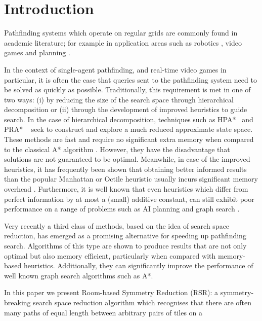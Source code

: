 \section{Introduction}
Pathfinding systems which operate on regular grids are commonly found in
academic literature; for example in application areas such as robotics 
\cite{choset05}, video games \cite{botea04,sturtevant05,bjornsson06} and 
planning \cite{thayer10,DBLP:conf/aips/HernandezMSK09,DBLP:conf/aips/WangB08,DBLP:conf/aips/BulitkoBLSS07}.
\par
In the context of single-agent pathfinding, and real-time video games in particular, 
it is often the case that queries sent to the pathfinding system  need to be solved as quickly as possible.
Traditionally, this requirement is met in one of two ways: (i) by reducing the size of the search space through hierarchical 
decomposition or (ii) through the development of improved heuristics to guide search.
In the case of hierarchical decomposition, techniques such as
HPA*~\cite{botea04} and PRA* ~\cite{sturtevant05} seek to construct and explore
a much reduced approximate state space.
These methods are fast and require no significant extra memory when compared to the classical
A* algorithm \cite{hart68}.
However, they have the disadvantage that solutions are not guaranteed to be optimal.
Meanwhile, in case of the improved heuristics, it has frequently been shown
that obtaining better informed results than the popular
Manhattan or Octile heuristic usually incurs significant memory overhead 
\cite{sturtevant09,goldberg05,Cazenave:06,bjornsson06}.
Furthermore, it is well known that even heuristics which differ from perfect information 
by at most a (small) additive constant, can still exhibit poor performance on a range of 
problems such as AI planning and graph search \cite{helmert08,pohl77}.
\par
Very recently a third class of methods, based on the idea of search space
reduction, has emerged as a promising alternative for speeding up pathfinding
search.
Algorithms of this type \cite{bjornsson06,pochter10,harabor10} are shown to produce 
results that are not only optimal but also memory efficient, particularly when compared 
with memory-based heuristics.
Additionally, they can significantly improve the performance of well known graph
search algorithms such as A*.
\par
In this paper we present Room-based Symmetry Reduction (RSR): a
symmetry-breaking search space reduction algorithm which recognises 
that there are often many paths of equal length between arbitrary pairs of tiles on a 
